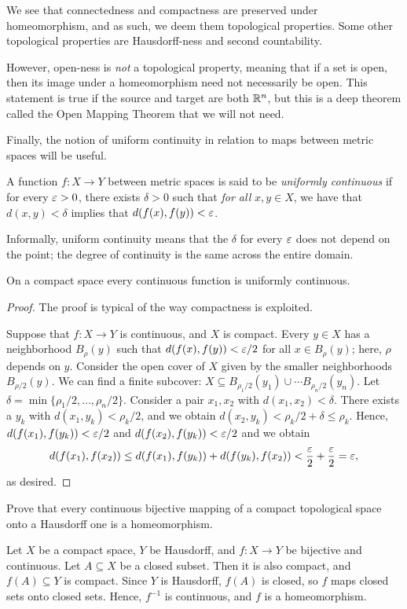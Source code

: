 We see that connectedness and compactness are preserved under homeomorphism, and as such, we deem them topological properties. Some other topological properties are Hausdorff-ness and second countability.

However, open-ness is \textit{not} a topological property, meaning that if a set is open, then its image under a homeomorphism need not necessarily be open. This statement is true if the source and target are both $\mathbb R^n$, but this is a deep theorem called the Open Mapping Theorem that we will not need.

Finally, the notion of uniform continuity in relation to maps between metric spaces will be useful.

\begin{definition}
	A function $f \colon X \rightarrow Y$ between metric spaces is said to be \emph{uniformly continuous} if for every $\varepsilon>0$, there exists $\delta>0$ such that \emph{for all} $x,y \in X$, we have that $d(x,y)<\delta$ implies that $d(f(x),f(y))<\varepsilon$.
\end{definition}

Informally, uniform continuity means that the $\delta$ for every $\varepsilon$ does not depend on the point; the degree of continuity is the same across the entire domain.

\begin{theorem}
	On a compact space every continuous function is uniformly continuous.
\end{theorem}
\begin{proof}
	The proof is typical of the way compactness is exploited.
	
	Suppose that $f \colon X \rightarrow Y$ is continuous, and $X$ is compact. Every $y \in X$ has a neighborhood $B_{\rho}(y)$ such that $d(f(x),f(y))<\varepsilon/2$ for all $x \in B_{\rho}(y)$; here, $\rho$ depends on $y$. Consider the open cover of $X$ given by the smaller neighborhoods $B_{\rho/2}(y)$. We can find a finite subcover: $X \subseteq B_{\rho_1/2}(y_1) \cup \cdots B_{\rho_n/2}(y_n)$. Let $\delta=\min\{\rho_1/2,\dots,\rho_n/2\}$. Consider a pair $x_1,x_2$ with $d(x_1,x_2)<\delta$. There exists a $y_k$ with $d(x_1,y_k)<\rho_k/2$, and we obtain $d(x_2,y_k)<\rho_k/2+\delta \le \rho_k$. Hence, $d(f(x_1),f(y_k))<\varepsilon/2$ and $d(f(x_2),f(y_k))<\varepsilon/2$ and we obtain $$d(f(x_1),f(x_2)) \le d(f(x_1),f(y_k))+d(f(y_k),f(x_2))<\dfrac{\varepsilon}{2}+\dfrac{\varepsilon}{2}=\varepsilon,$$ as desired.
\end{proof}

\begin{exercise}
	Prove that every continuous bijective mapping of a compact topological space onto a Hausdorff one is a homeomorphism.
	
	\begin{sol}
		Let $X$ be a compact space, $Y$ be Hausdorff, and $f \colon X \rightarrow Y$ be bijective and continuous. Let $A \subseteq X$ be a closed subset. Then it is also compact, and $f(A) \subseteq Y$ is compact. Since $Y$ is Hausdorff, $f(A)$ is closed, so $f$ maps closed sets onto closed sets. Hence, $f^{-1}$ is continuous, and $f$ is a homeomorphism.
	\end{sol}
\end{exercise}